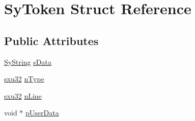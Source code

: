 \hypertarget{struct_sy_token}{\section{Sy\-Token Struct Reference}
\label{d3/deb/struct_sy_token}
}
\subsection*{Public Attributes}
\begin{DoxyCompactItemize}
\item 
\hyperlink{struct_sy_string}{Sy\-String} \hyperlink{struct_sy_token_ae9d78edf5d608ecac3a226b58abee26f}{s\-Data}
\item 
\hyperlink{unqlite_8c_abc5a8a3f345c200c98c485551f49666e}{sxu32} \hyperlink{struct_sy_token_a5f87b218ff7391321ae4fce9621e7d01}{n\-Type}
\item 
\hyperlink{unqlite_8c_abc5a8a3f345c200c98c485551f49666e}{sxu32} \hyperlink{struct_sy_token_abd07be802606ecdf3a121e0cba32c28e}{n\-Line}
\item 
void $\ast$ \hyperlink{struct_sy_token_a7e60a5c366345320717e78a0b8e652e7}{p\-User\-Data}
\end{DoxyCompactItemize}


